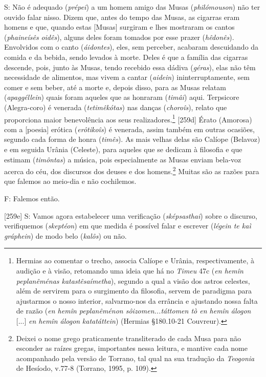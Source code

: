 S: Não é adequado (\emph{prépei}) a um homem amigo das Musas
(\emph{philómouson}) não ter ouvido falar nisso. Dizem que, antes do
tempo das Musas, as cigarras eram homens e que, quando estas {[}Musas{]}
surgiram e lhes mostraram os cantos (\emph{phaineísês} \emph{oidês}),
alguns deles foram tomados por esse prazer (\emph{hêdonês}). Envolvidos
com o canto (\emph{áidontes}), eles, sem perceber, acabaram descuidando
da comida e da bebida, sendo levados à morte. Deles é que a família das
cigarras descende, pois, junto às Musas, tendo recebido essa dádiva
(\emph{géras}), elas não têm necessidade de alimentos, mas vivem a
cantar (\emph{aidein}) ininterruptamente, sem comer e sem beber, até a
morte e, depois disso, para as Musas relatam (\emph{apaggéllein}) quais
foram aqueles que as honraram (\emph{timâi}) aqui. Terpsicore
(Alegra-coro) é venerada (\emph{tetimêkótas}) nas danças
(\emph{choroîs}), relato que proporciona maior benevolência aos seus
realizadores.\footnote{Hermias ao comentar o trecho, associa Calíope e
  Urânia, respectivamente, à audição e à visão, retomando uma ideia que
  há no \emph{Timeu} 47c (\emph{en hemîn peplanêménas katastêsaímetha}),
  segundo a qual a visão dos astros celestes, além de servirem para o
  surgimento da filosofia, servem de paradigma para ajustarmos o nosso
  interior, salvarmo-nos da errância e ajustando nossa falta de razão
  (\emph{en hemîn peplanêménon sôizomen...táttomen tò en hemîn álogon}
  {[}...{]} \emph{en hemîn álogon} \emph{katatáttein}) (Hermias
  §180.10-21 Couvreur).} {[}259d{]} Érato (Amorosa) com a {[}poesia{]}
erótica (\emph{erôtikoîs}) é venerada, assim também em outras ocasiões,
segundo cada forma de honra (\emph{timês}). As mais velhas delas são
Calíope (Belavoz) e em seguida Urânia (Celeste), para aqueles que se
dedicam à filosofia e que estimam (\emph{timôntas}) a música, pois
especialmente as Musas enviam bela-voz acerca do céu, dos discursos dos
deuses e dos homens.\footnote{Deixei o nome grego praticamente
  transliterado de cada Musa para não esconder as raízes gregas,
  importantes nessa leitura, e mantive cada nome acompanhado pela versão
  de Torrano, tal qual na sua tradução da \emph{Teogonia} de Hesíodo,
  v.77-8 (Torrano, 1995, p. 109).} Muitas são as razões para que falemos
ao meio-dia e não cochilemos.

F: Falemos então.

{[}259e{]} S: Vamos agora estabelecer uma verificação
(\emph{sképsasthai}) sobre o discurso, verifiquemos (\emph{skeptéon}) em
que medida é possível falar e escrever (\emph{légein te kaì gráphein})
de modo belo (\emph{kalôs}) ou não.

